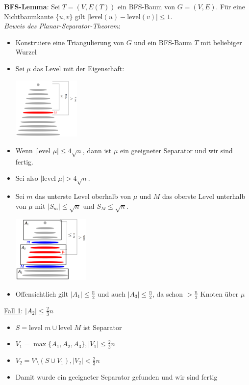 \textbf{BFS-Lemma}: Sei $T = (V,E(T))$ ein BFS-Baum von $G = (V , E)$. Für eine Nichtbaumkante $\{u,v\}$ gilt $|\text{level}(u)-\text{level}(v)|\leq 1$.\\

\textit{Beweis des Planar-Separator-Theorem}: 
\begin{itemize}
	\item Konstruiere eine Triangulierung von $G$ und ein BFS-Baum $T$ mit beliebiger Wurzel
	\item Sei $\mu$ das Level mit der Eigenschaft:
	\begin{center}
		\includegraphics[width=0.26\textwidth]{images/pst-7.png}
	\end{center}
	\item Wenn $|\text{level } \mu|\leq 4\sqrt{n}$, dann ist $\mu$ ein geeigneter Separator und wir sind fertig.
	\item Sei also $|\text{level } \mu|> 4\sqrt{n}$.
	\item Sei $m$ das unterste Level oberhalb von $\mu$ und $M$ das oberste Level unterhalb von $\mu$ mit $|S_m|\leq\sqrt{n}$ und $S_M\leq\sqrt{n}$.
	\begin{center}
		\includegraphics[width=0.3\textwidth]{images/pst-8.png}
	\end{center}
	\item Offensichtlich gilt $|A_1|\leq\frac{n}{2} \text{ und auch }|A_3|\leq\frac{n}{2}$, da schon $>\frac{n}{2}$ Knoten über $\mu$ 
\end{itemize}
\medskip
\underline{Fall 1}: $|A_2|\leq\frac{2}{3}n$
\begin{itemize}
	\item $S=\text{level }m\cup\text{level }M$ ist Separator
	\item $V_1=\max\{A_1,A_2,A_3\}, |V_1|\leq\frac{2}{3}n$
	\item $V_2=V\setminus(S\cup V_1), |V_2|<\frac{2}{3}n$
	\item Damit wurde ein geeigneter Separator gefunden und wir sind fertig
\end{itemize}

